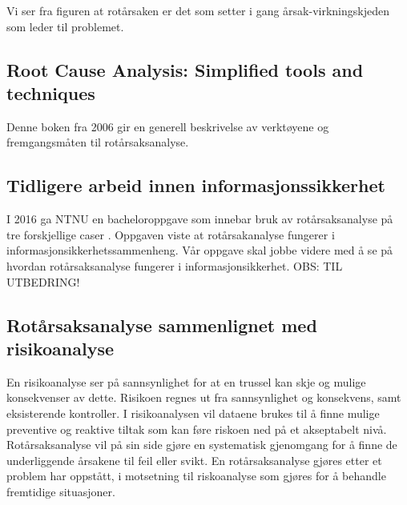 Vi ser fra figuren at rotårsaken er det som setter i gang årsak-virkningskjeden som leder til problemet. 

\subsection{Root Cause Analysis: Simplified tools and techniques}
Denne boken fra 2006 gir en generell beskrivelse av verktøyene og fremgangsmåten til rotårsaksanalyse. 

\subsection{Tidligere arbeid innen informasjonssikkerhet}
I 2016 ga NTNU en bacheloroppgave som innebar bruk av rotårsaksanalyse på tre forskjellige caser \cite{RCARapport}. Oppgaven viste at rotårsakanalyse fungerer i informasjonsikkerhetssammenheng. Vår oppgave skal jobbe videre med å se på hvordan rotårsaksanalyse fungerer i informasjonsikkerhet. OBS: TIL UTBEDRING!

\subsection{Rotårsaksanalyse sammenlignet med risikoanalyse}
En risikoanalyse ser på sannsynlighet for at en trussel kan skje og mulige konsekvenser av dette. Risikoen regnes ut fra sannsynlighet og konsekvens, samt eksisterende kontroller. I risikoanalysen vil dataene brukes til å finne mulige preventive og reaktive tiltak som kan føre riskoen ned på et akseptabelt nivå. Rotårsaksanalyse vil på sin side gjøre en systematisk gjenomgang for å finne de underliggende årsakene til feil eller svikt. En rotårsaksanalyse gjøres etter et problem har oppstått, i motsetning til riskoanalyse som gjøres for å behandle fremtidige situasjoner. 